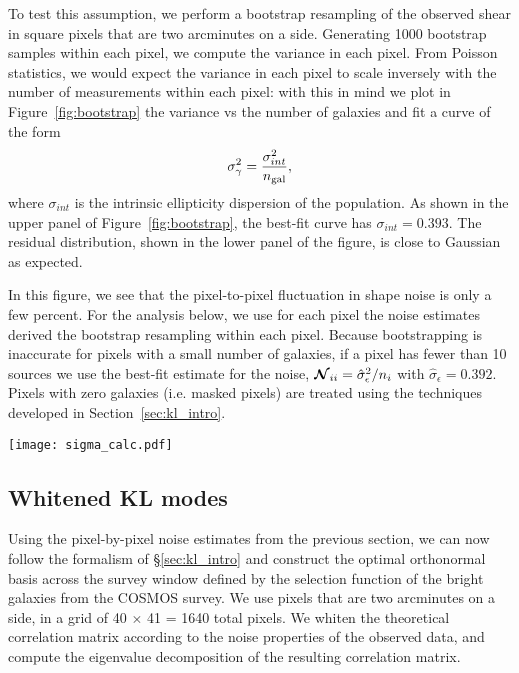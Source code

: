 To test this assumption, we perform a bootstrap resampling of the observed
shear in square pixels that are two arcminutes on a side.
Generating 1000 bootstrap samples within each
pixel, we compute the variance in each pixel.
From Poisson statistics, we would expect the variance in each pixel to
scale inversely with the number of measurements within each pixel: with this
in mind we plot in Figure~\ref{fig:bootstrap}
the variance vs the number of galaxies and fit a curve of the form 
\begin{equation}
  \sigma_\gamma^2 = \frac{\sigma_{int}^2}{n_{\rm gal}},
\end{equation}
where $\sigma_{int}$ is the intrinsic ellipticity dispersion of the population.
As shown in the upper panel of Figure~\ref{fig:bootstrap}, the best-fit
curve has $\sigma_{int} = 0.393$.  The residual distribution, shown in the
lower panel of the figure, is close to Gaussian as expected.

In this figure, we see that the pixel-to-pixel fluctuation in shape noise
is only a few percent.  For the analysis below, we use for each pixel
the noise estimates derived the bootstrap resampling within each pixel.
Because bootstrapping is inaccurate
for pixels with a small number of galaxies, if a pixel has fewer than 10
sources we use the best-fit estimate for the noise,
$\boldsymbol{\mathcal{N}}_{ii} = \hat{\sigma}_\epsilon^2 / n_i$
with $\hat{\sigma}_\epsilon = 0.392$.  Pixels with zero galaxies (i.e.
masked pixels) are treated using the techniques developed in
Section~\ref{sec:kl_intro}.

\begin{figure*}
 \centering
 \texttt{[image: sigma\_calc.pdf]}
 \caption{Bootstrap estimates of the shape noise for each pixel.  The estimates
   reflect an intrinsic ellipticity of $0.393 \pm 0.013$.
   \label{fig:bootstrap}}
\end{figure*}

\subsection{Whitened KL modes}
Using the pixel-by-pixel noise estimates from the previous section, we can
now follow the formalism of \S\ref{sec:kl_intro} and construct the optimal
orthonormal basis across the survey window defined by the selection function
of the bright galaxies from the COSMOS survey.  We use pixels that are
two arcminutes on a side, in a grid of 40 $\times$ 41 = 1640 total
pixels.  We whiten the theoretical correlation matrix according to the noise
properties of the observed data, and compute the eigenvalue decomposition
of the resulting correlation matrix.

